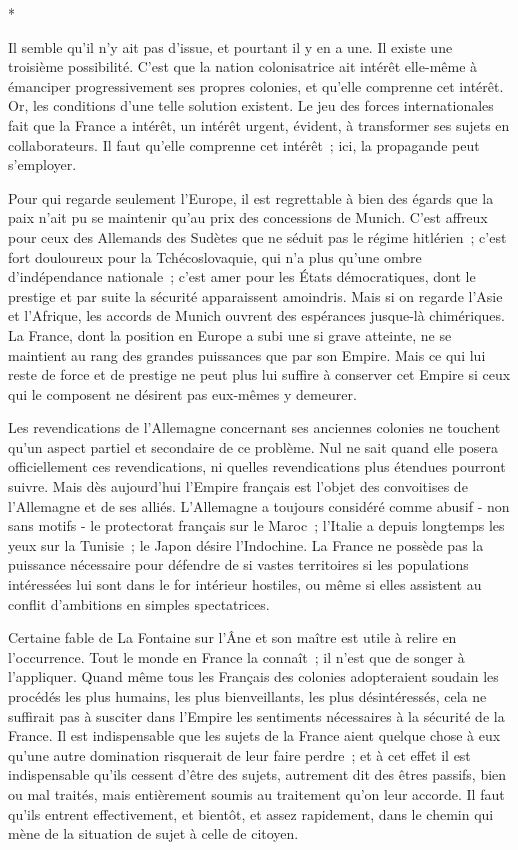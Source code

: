 \documentclass[french,twoside]{book} %
\begin{document}
\begin{center}
*\end{center}
\noindent Il semble qu'il n'y ait pas d'issue, et pourtant il y en a une. Il existe une troisième possibilité. C'est que la nation colonisatrice ait intérêt elle-même à émanciper progressivement ses propres colonies, et qu'elle comprenne cet intérêt. Or, les conditions d'une telle solution existent. Le jeu des forces internationales fait que la France a intérêt, un intérêt urgent, évident, à trans­former ses sujets en collaborateurs. Il faut qu'elle comprenne cet intérêt ; ici, la propagande peut s'employer.\par
Pour qui regarde seulement l'Europe, il est regrettable à bien des égards que la paix n'ait pu se maintenir qu'au prix des concessions de Munich. C'est affreux pour ceux des Allemands des Sudètes que ne séduit pas le régime hitlérien ; c'est fort douloureux pour la Tchécoslovaquie, qui n'a plus qu'une ombre d'indépendance nationale ; c'est amer pour les États démocratiques, dont le prestige et par suite la sécurité apparaissent amoindris. Mais si on regarde l'Asie et l'Afrique, les accords de Munich ouvrent des espérances jusque-là chimériques. La France, dont la position en Europe a subi une si grave atteinte, ne se maintient au rang des grandes puissances que par son Empire. Mais ce qui lui reste de force et de prestige ne peut plus lui suffire à conserver cet Empire si ceux qui le composent ne désirent pas eux-mêmes y demeurer.\par
Les revendications de l'Allemagne concernant ses anciennes colonies ne touchent qu'un aspect partiel et secondaire de ce problème. Nul ne sait quand elle posera officiellement ces revendications, ni quelles revendications plus étendues pourront suivre. Mais dès aujourd’hui l'Empire français est l'objet des convoitises de l'Allemagne et de ses alliés. L'Allemagne a toujours considéré comme abusif - non sans motifs - le protectorat français sur le Maroc ; l'Italie a depuis longtemps les yeux sur la Tunisie ; le Japon désire l'Indochine. La France ne possède pas la puissance nécessaire pour défendre de si vastes territoires si les populations intéressées lui sont dans le for intérieur hostiles, ou même si elles assistent au conflit d'ambitions en simples spectatrices.\par
Certaine fable de La Fontaine sur l'Âne et son maître est utile à relire en l'occurrence. Tout le monde en France la connaît ; il n'est que de songer à l'appliquer. Quand même tous les Français des colonies adopteraient soudain les procédés les plus humains, les plus bienveillants, les plus désintéressés, cela ne suffirait pas à susciter dans l'Empire les sentiments nécessaires à la sécurité de la France. Il est indispensable que les sujets de la France aient quelque chose à eux qu'une autre domination risquerait de leur faire perdre ; et à cet effet il est indispensable qu'ils cessent d'être des sujets, autrement dit des êtres passifs, bien ou mal traités, mais entièrement soumis au traitement qu'on leur accorde. Il faut qu'ils entrent effectivement, et bientôt, et assez rapide­ment, dans le chemin qui mène de la situation de sujet à celle de citoyen.\par
\par
\end{document}
